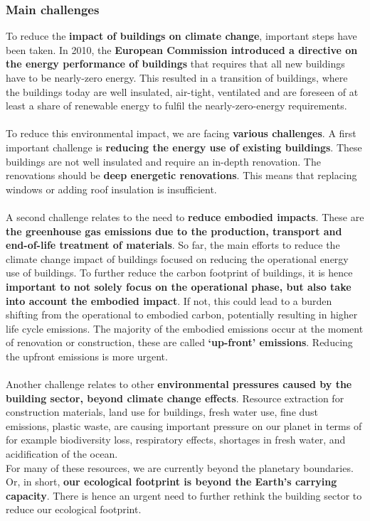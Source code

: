 \documentclass[../summary.tex]{subfiles}
\begin{document}
	\subsubsection{Main challenges}
	
	To reduce the \textbf{impact of buildings on climate change}, important steps have been taken. In 2010, the \textbf{European Commission introduced a directive on the energy performance of buildings} that requires that all new buildings have to be nearly-zero energy. This resulted in a transition of buildings, where the buildings today are well insulated, air-tight, ventilated and are foreseen of at least a share of renewable energy to fulfil the nearly-zero-energy requirements.
	\\\\
	To reduce this environmental impact, we are facing \textbf{various challenges}. A first important challenge is \textbf{reducing the energy use of existing buildings}. These buildings are not well insulated and require an in-depth renovation. The renovations should be \textbf{deep energetic renovations}. This means that replacing windows or adding roof insulation is insufficient.
	\\\\
	A second challenge relates to the need to \textbf{reduce embodied impacts}. These are \textbf{the greenhouse gas emissions due to the production, transport and end-of-life treatment of materials}. So far, the main efforts to reduce the climate change impact of buildings focused on reducing the operational energy use of buildings. To further reduce the carbon footprint of buildings, it is hence \textbf{important to not solely focus on the operational phase, but also take into account the embodied impact}. If not, this could lead to a burden shifting from the operational to embodied carbon, potentially resulting in higher life cycle emissions. The majority of the embodied emissions occur at the moment of renovation or construction, these are called \textbf{‘up-front’ emissions}. Reducing the upfront emissions is more urgent.
	\\\\
	Another challenge relates to other \textbf{environmental pressures caused by the building sector, beyond climate change effects}. Resource extraction for construction materials, land use for buildings, fresh water use, fine dust emissions, plastic waste, are causing important pressure on our planet in terms of for example biodiversity loss, respiratory effects, shortages in fresh water, and acidification of the ocean. 
	\\
	For many of these resources, we are currently beyond the planetary boundaries. Or, in short, \textbf{our ecological footprint is beyond the Earth’s carrying capacity}. There is hence an urgent need to further rethink the building sector to reduce our ecological footprint. 
	
\end{document}
